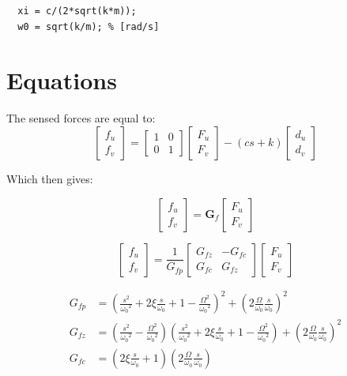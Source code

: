 \documentclass[a4paper, 10pt, DIV=12, parskip=full]{scrreprt}
\begin{document}
\begin{verbatim}
  xi = c/(2*sqrt(k*m));
  w0 = sqrt(k/m); % [rad/s]
\end{verbatim}

\section{Equations}
\label{sec:orgad8546b}
The sensed forces are equal to:
\begin{equation}
\begin{bmatrix} f_{u} \\ f_{v} \end{bmatrix} =
\begin{bmatrix}
  1 & 0 \\
  0 & 1
\end{bmatrix}
\begin{bmatrix} F_u \\ F_v \end{bmatrix} - (c s + k)
\begin{bmatrix} d_u \\ d_v \end{bmatrix}
\end{equation}

Which then gives:
\begin{important}
\begin{equation}
\begin{bmatrix} f_{u} \\ f_{v} \end{bmatrix} =
\bm{G}_{f}
\begin{bmatrix} F_u \\ F_v \end{bmatrix}
\end{equation}

\begin{equation}
\begin{bmatrix} f_{u} \\ f_{v} \end{bmatrix} =
\frac{1}{G_{fp}}
\begin{bmatrix}
  G_{fz} & -G_{fc} \\
  G_{fc} &  G_{fz}
\end{bmatrix}
\begin{bmatrix} F_u \\ F_v \end{bmatrix}
\end{equation}

\begin{align}
  G_{fp} &= \left( \frac{s^2}{{\omega_0}^2} + 2 \xi \frac{s}{\omega_0} + 1 - \frac{{\Omega}^2}{{\omega_0}^2} \right)^2 + \left( 2 \frac{\Omega}{\omega_0} \frac{s}{\omega_0} \right)^2 \\
  G_{fz} &= \left( \frac{s^2}{{\omega_0}^2} - \frac{\Omega^2}{{\omega_0}^2} \right) \left( \frac{s^2}{{\omega_0}^2} + 2 \xi \frac{s}{\omega_0} + 1 - \frac{{\Omega}^2}{{\omega_0}^2} \right) + \left( 2 \frac{\Omega}{\omega_0} \frac{s}{\omega_0} \right)^2 \\
  G_{fc} &= \left( 2 \xi \frac{s}{\omega_0} + 1 \right) \left( 2 \frac{\Omega}{\omega_0} \frac{s}{\omega_0} \right)
\end{align}
\end{important}
\end{document}
